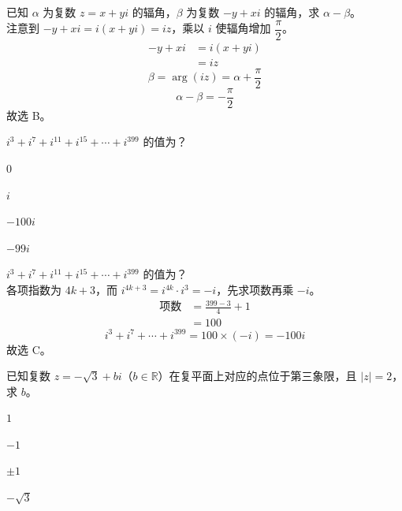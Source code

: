 \documentclass[12pt,a4paper]{exam-zh}
\begin{document}
\begin{solution}
    已知 $\alpha$ 为复数 $z=x+yi$ 的辐角，$\beta$ 为复数 $-y+xi$ 的辐角，求 $\alpha-\beta$。 \\
    注意到 $-y+xi=i(x+yi)=iz$，乘以 $i$ 使辐角增加 $\dfrac{\pi}{2}$。 \\
    \begin{align*}
        -y+xi &= i(x+yi) \\
        &= iz
    \end{align*}
    \[
        \beta = \arg(iz) = \alpha+\frac{\pi}{2}
    \]
    \[
        \alpha-\beta = -\frac{\pi}{2}
    \]
    故选 B。
\end{solution}



\begin{question}
    $i^3+i^7+i^{11}+i^{15}+\cdots+i^{399}$ 的值为？ \paren[2]
    \begin{choices}
        \item $0$
        \item $i$
        \item $-100i$
        \item $-99i$
    \end{choices}
\end{question}

\begin{solution}
    $i^3+i^7+i^{11}+i^{15}+\cdots+i^{399}$ 的值为？ \\
    各项指数为 $4k+3$，而 $i^{4k+3}=i^{4k}\cdot i^3=-i$，先求项数再乘 $-i$。 \\
    \begin{align*}
        \text{项数} &= \frac{399-3}{4}+1 \\
        &= 100
    \end{align*}
    \[
        i^3+i^7+\cdots+i^{399} = 100\times(-i) = -100i
    \]
    故选 C。
\end{solution}

\begin{question}
    已知复数 $z=-\sqrt{3}+bi$（$b\in\mathbb{R}$）在复平面上对应的点位于第三象限，且 $|z|=2$，求 $b$。 \paren[2]
    \begin{choices}
        \item $1$
        \item $-1$
        \item $\pm1$
        \item $-\sqrt{3}$
    \end{choices}
\end{question}
\end{document}
